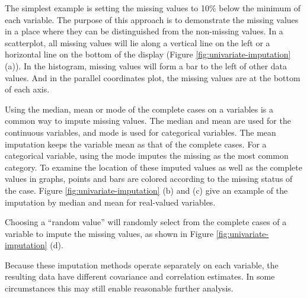 \documentclass[article]{jss}
\begin{document}
The simplest example is setting the missing values to 10\% below the minimum of each variable. The purpose of this approach is to demonstrate the missing values in a place where they can be distinguished from the non-missing values. In a scatterplot, all missing values will lie along a vertical line on the left or a horizontal line on the bottom of the display (Figure \ref{fig:univariate-imputation} (a)). In the histogram, missing values will form a bar to the left of other data values. And in the parallel coordinates plot, the missing values are at the bottom of each axis.

Using the median, mean or mode of the complete cases on a variables is a common way to impute missing values. The median and mean are used for the continuous variables, and mode is used for categorical variables. The mean imputation keeps the variable mean as that of the complete cases. For a categorical variable, using the mode imputes the missing as the most common category. To examine the location of these imputed values as well as the complete values in graphs, points and bars are colored according to the missing status of the case. Figure \ref{fig:univariate-imputation} (b) and (c) give an example of the imputation by median and mean for real-valued variables.

Choosing a ``random value''  will randomly select from the complete cases of a variable to impute the missing values, as shown in Figure \ref{fig:univariate-imputation} (d).

Because these imputation methods operate separately on each variable, the resulting data have different covariance and correlation estimates. In some circumstances this may still enable reasonable further analysis.
\end{document}
